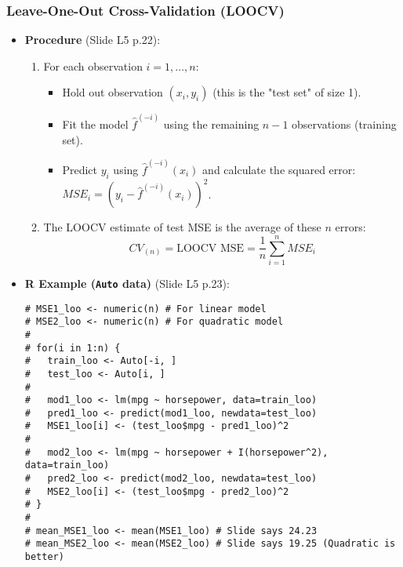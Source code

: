 \documentclass[12pt,a4paper]{article}
\newcommand{\Robject}[1]{\texttt{#1}} %
\begin{document}
\begin{itemize}
    \subsubsection{Leave-One-Out Cross-Validation (LOOCV) }
        \begin{itemize}
            \item \textbf{Procedure} (Slide L5 p.22):
                \begin{enumerate}
                    \item For each observation $i=1, \dots, n$:
                        \begin{itemize}
                            \item Hold out observation $(x_i, y_i)$ (this is the "test set" of size 1).
                            \item Fit the model $\hat{f}^{(-i)}$ using the remaining $n-1$ observations (training set).
                            \item Predict $y_i$ using $\hat{f}^{(-i)}(x_i)$ and calculate the squared error: $MSE_i = (y_i - \hat{f}^{(-i)}(x_i))^2$.
                        \end{itemize}
                    \item The LOOCV estimate of test MSE is the average of these $n$ errors:
                        $$ CV_{(n)} = \text{LOOCV MSE} = \frac{1}{n} \sum_{i=1}^{n} MSE_i $$
                \end{enumerate}
            \item \textbf{R Example (\Robject{Auto} data)} (Slide L5 p.23):
\begin{lstlisting}[caption={LOOCV for Auto Data (Conceptual from Slide L5 p.23)}]
# MSE1_loo <- numeric(n) # For linear model
# MSE2_loo <- numeric(n) # For quadratic model
# 
# for(i in 1:n) {
#   train_loo <- Auto[-i, ]
#   test_loo <- Auto[i, ]
#   
#   mod1_loo <- lm(mpg ~ horsepower, data=train_loo)
#   pred1_loo <- predict(mod1_loo, newdata=test_loo)
#   MSE1_loo[i] <- (test_loo$mpg - pred1_loo)^2
#   
#   mod2_loo <- lm(mpg ~ horsepower + I(horsepower^2), data=train_loo)
#   pred2_loo <- predict(mod2_loo, newdata=test_loo)
#   MSE2_loo[i] <- (test_loo$mpg - pred2_loo)^2
# }
# 
# mean_MSE1_loo <- mean(MSE1_loo) # Slide says 24.23
# mean_MSE2_loo <- mean(MSE2_loo) # Slide says 19.25 (Quadratic is better)


\end{lstlisting}
\end{itemize}
\end{itemize}
\end{document}
